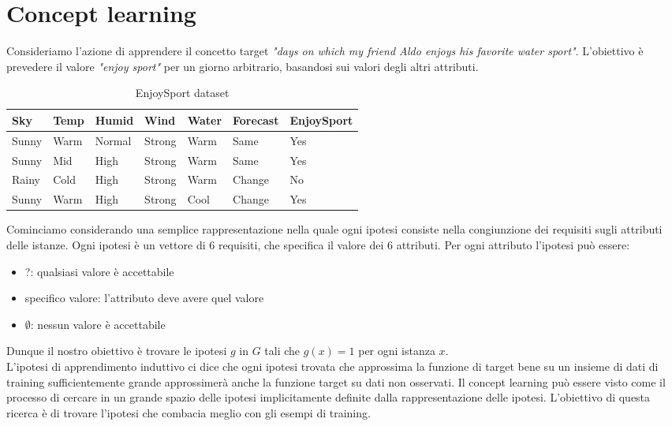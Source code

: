 \section{Concept learning}
Consideriamo l'azione di apprendere il concetto target \textit{"days on which my friend Aldo enjoys his favorite water sport"}.
L'obiettivo è prevedere il valore \textit{"enjoy sport"} per un giorno arbitrario, basandosi sui valori degli altri attributi.
\begin{table}[H]
\centering
\begin{tabular}{lllllll}
\toprule
\textbf{Sky} & \textbf{Temp} & \textbf{Humid} & \textbf{Wind} & \textbf{Water} & \textbf{Forecast} & \textbf{EnjoySport} \\
\midrule
Sunny & Warm & Normal & Strong & Warm & Same & Yes \\
Sunny & Mid & High & Strong & Warm & Same & Yes \\
Rainy & Cold & High & Strong & Warm & Change & No \\
Sunny & Warm & High & Strong & Cool & Change & Yes \\
\bottomrule
\end{tabular}
\caption{EnjoySport dataset}
\label{tab:enjoysport}
\end{table} \noindent
Cominciamo considerando una semplice rappresentazione nella quale ogni ipotesi consiste nella congiunzione dei requisiti sugli attributi delle istanze.
Ogni ipotesi è un vettore di 6 requisiti, che specifica il valore dei 6 attributi.
Per ogni attributo l'ipotesi può essere:
\begin{itemize}
	\item ?: qualsiasi valore è accettabile
	\item specifico valore: l'attributo deve avere quel valore
	\item $\emptyset$: nessun valore è accettabile
\end{itemize}
Dunque il nostro obiettivo è trovare le ipotesi $g$ in $G$ tali che $g(x) = 1$ per ogni istanza $x$.\\
L'ipotesi di apprendimento induttivo ci dice che ogni ipotesi trovata che approssima la funzione di target bene su un insieme di dati di training sufficientemente grande approssimerà anche la funzione target su dati non osservati.
Il concept learning può essere visto come il processo di cercare in un grande spazio delle ipotesi implicitamente definite dalla rappresentazione delle ipotesi.
L'obiettivo di questa ricerca è di trovare l'ipotesi che combacia meglio con gli esempi di training.
